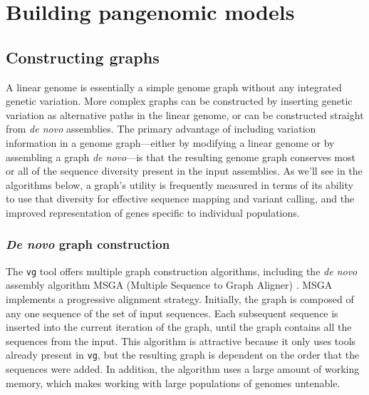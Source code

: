 \section{Building pangenomic models}

\subsection{Constructing graphs} 

A linear genome is essentially a simple genome graph without any integrated genetic variation. 
More complex graphs can be constructed by inserting genetic variation as alternative paths in the linear genome, or can be constructed straight from \textit{de novo} assemblies. 
The primary advantage of including variation information in a genome graph---either by modifying a linear genome or by assembling a graph \textit{de novo}---is that the resulting genome graph conserves most or all of the sequence diversity present in the input assemblies. 
As we'll see in the algorithms below, a graph's utility is frequently measured in terms of its ability to use that diversity for effective sequence mapping and variant calling, and the improved representation of genes specific to individual populations.

\subsubsection{\textit{De novo} graph construction}

The \texttt{vg} tool offers multiple graph construction algorithms, including the \textit{de novo} assembly algorithm MSGA (Multiple Sequence to Graph Aligner) \cite{Garrison_2018,Novak_2017a}. 
MSGA implements a progressive alignment strategy.
Initially, the graph is composed of any one sequence of the set of input sequences.
Each subsequent sequence is inserted into the current iteration of the graph, until the graph contains all the sequences from the input.
This algorithm is attractive because it only uses tools already present in \texttt{vg}, but the resulting graph is dependent on the order that the sequences were added.
In addition, the algorithm uses a large amount of working memory, which makes working with large populations of genomes untenable.


